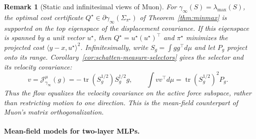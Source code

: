 \documentclass{article}
\newtheorem{remark}[theorem]{Remark}
\newcommand{\MJ}{\mathcal{J}}
\newcommand{\tr}{\operatorname{tr}}
\begin{document}
\begin{remark}[Static and infinitesimal views of Muon]\label{rmk:muon-insight}
For $\gamma_\infty(S)=\lambda_{\max}(S)$, the optimal cost certificate
$Q^\star\in\partial\gamma_\infty(\Sigma_{\pi^\star})$ of
Theorem~\ref{thm:minmax} is supported on the top eigenspace of the
displacement covariance. If this eigenspace is spanned by a unit vector
$u^\star$, then $Q^\star=u^\star(u^\star)^\top$ and $\pi^\star$ minimizes
the projected cost $\langle y-x,u^\star\rangle^2$.
Infinitesimally, write $S_g=\int gg^\top d\mu$ and let $P_g$ project onto
its range. Corollary~\ref{cor:schatten-measure-selectors} gives the selector
and its velocity covariance:
\[
 v=\MJ_{\gamma_\infty}^\mu(g)=-\tr(S_g^{1/2})S_g^{\dagger/2}g,
 \qquad \int vv^\top d\mu=\tr(S_g^{1/2})^2P_g.
\]
Thus the flow equalizes the velocity covariance on the active force
subspace, rather than restricting motion to one direction. This is the
mean-field counterpart of Muon's matrix orthogonalization.
\end{remark}

\paragraph{Mean-field models for two-layer MLPs.}
\label{sec:mlp-meanfield}
\end{document}
